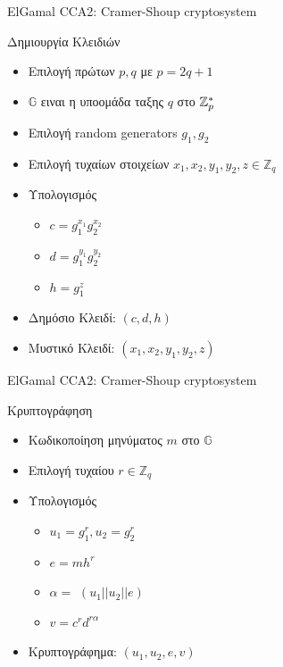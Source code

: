 \documentclass[handout]{beamer}
\begin{document}
\begin{frame}{ElGamal CCA2: Cramer-Shoup cryptosystem}
\begin{block}{Δημιουργία Κλειδιών}
\begin{itemize}
\item Επιλογή πρώτων $p,q$ με $p=2q+1$ \pause
\item $\mathbb{G}$ ειναι η υποομάδα ταξης $q$ στο $\mathbb{Z}^*_p$ \pause
\item Επιλογή random generators $g_1, g_2$ \pause

\item Επιλογή τυχαίων στοιχείων $x_1,x_2,y_1,y_2,z \in \mathbb{Z}_{q}$ \pause
\item Υπολογισμός
\begin{itemize} 
\item $c=g_1^{x_1}g_2^{x_2}$
\item $d=g_1^{y_1}g_2^{y_2}$
\item $h=g_1^{z}$
\end{itemize} \pause
\item Δημόσιο Κλειδί: $(c,d,h)$ \pause
\item Μυστικό Κλειδί: $(x_1,x_2,y_1,y_2,z)$ \pause
\end{itemize}
\end{block}

\end{frame}
\begin{frame}{ElGamal CCA2: Cramer-Shoup cryptosystem}

\begin{block}{Κρυπτογράφηση}
\begin{itemize}
\item Κωδικοποίηση μηνύματος $m$ στο $\mathbb{G}$ \pause
\item Επιλογή τυχαίου $r \in \mathbb{Z}_{q}$ \pause
\item Υπολογισμός
\begin{itemize} 
\item $u_1 = g_1^r,u_2 = g_2^r$ \pause
\item $e = m h^r$ \pause
\item $\alpha = $ \hash$(u_1||u_2||e)$ \pause
\item $v = c^r d^{r\alpha}$  \pause
\end{itemize}
\item Κρυπτογράφημα: $(u_1,u_2,e,v)$
\end{itemize}
\end{block}

\end{frame}
\end{document}
